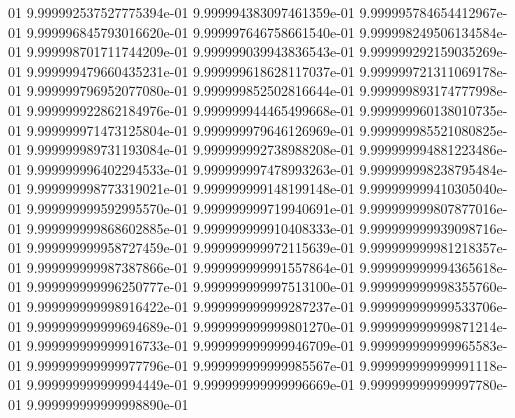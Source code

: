01	9.999992537527775394e-01	9.999994383097461359e-01	9.999995784654412967e-01	9.999996845793016620e-01	9.999997646758661540e-01	9.999998249506134584e-01	9.999998701711744209e-01	9.999999039943836543e-01	9.999999292159035269e-01	9.999999479660435231e-01	9.999999618628117037e-01	9.999999721311069178e-01	9.999999796952077080e-01	9.999999852502816644e-01	9.999999893174777998e-01	9.999999922862184976e-01	9.999999944465499668e-01	9.999999960138010735e-01	9.999999971473125804e-01	9.999999979646126969e-01	9.999999985521080825e-01	9.999999989731193084e-01	9.999999992738988208e-01	9.999999994881223486e-01	9.999999996402294533e-01	9.999999997478993263e-01	9.999999998238795484e-01	9.999999998773319021e-01	9.999999999148199148e-01	9.999999999410305040e-01	9.999999999592995570e-01	9.999999999719940691e-01	9.999999999807877016e-01	9.999999999868602885e-01	9.999999999910408333e-01	9.999999999939098716e-01	9.999999999958727459e-01	9.999999999972115639e-01	9.999999999981218357e-01	9.999999999987387866e-01	9.999999999991557864e-01	9.999999999994365618e-01	9.999999999996250777e-01	9.999999999997513100e-01	9.999999999998355760e-01	9.999999999998916422e-01	9.999999999999287237e-01	9.999999999999533706e-01	9.999999999999694689e-01	9.999999999999801270e-01	9.999999999999871214e-01	9.999999999999916733e-01	9.999999999999946709e-01	9.999999999999965583e-01	9.999999999999977796e-01	9.999999999999985567e-01	9.999999999999991118e-01	9.999999999999994449e-01	9.999999999999996669e-01	9.999999999999997780e-01	9.999999999999998890e-01
